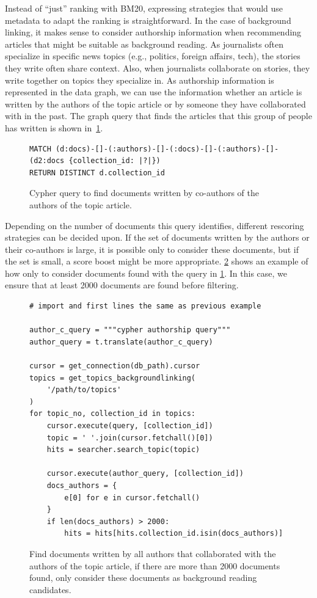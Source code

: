 \noindent Instead of ``just'' ranking with BM20, expressing strategies that would use metadata to adapt the ranking is straightforward. In the case of background linking, it makes sense to consider authorship information when recommending articles that might be suitable as background reading. As journalists often specialize in specific news topics (e.g., politics, foreign affairs, tech), the stories they write often share context. Also, when journalists collaborate on stories, they write together on topics they specialize in. As authorship information is represented in the data graph, we can use the information whether an article is written by the authors of the topic article or by someone they have collaborated with in the past. The graph query that finds the articles that this group of people has written is shown in~\cref{fig:author-cypher}.

\begin{figure}
	\begin{verbatim}
MATCH (d:docs)-[]-(:authors)-[]-(:docs)-[]-(:authors)-[]-(d2:docs {collection_id: |?|}) 
RETURN DISTINCT d.collection_id
	\end{verbatim}
	\caption{Cypher query to find documents written by co-authors of the authors of the topic article.}
	\label{fig:author-cypher}
\end{figure}

\noindent Depending on the number of documents this query identifies, different rescoring strategies can be decided upon. If the set of documents written by the authors or their co-authors is large, it is possible only to consider these documents, but if the set is small, a score boost might be more appropriate. \cref{fig:authors-code} shows an example of how only to consider documents found with the query in \cref{fig:author-cypher}. In this case, we ensure that at least 2000 documents are found before filtering.

\begin{figure}
	\begin{verbatim}
# import and first lines the same as previous example

author_c_query = """cypher authorship query"""
author_query = t.translate(author_c_query)

cursor = get_connection(db_path).cursor
topics = get_topics_backgroundlinking(
    '/path/to/topics'
)
for topic_no, collection_id in topics:
    cursor.execute(query, [collection_id])
    topic = ' '.join(cursor.fetchall()[0])
    hits = searcher.search_topic(topic)

    cursor.execute(author_query, [collection_id])
    docs_authors = {
        e[0] for e in cursor.fetchall()
    }
    if len(docs_authors) > 2000:
        hits = hits[hits.collection_id.isin(docs_authors)]
	\end{verbatim}
	\caption{Find documents written by all authors that collaborated with the authors of the topic article, if there are more than 2000 documents found, only consider these documents as background reading candidates.}
	\label{fig:authors-code}
\end{figure}

